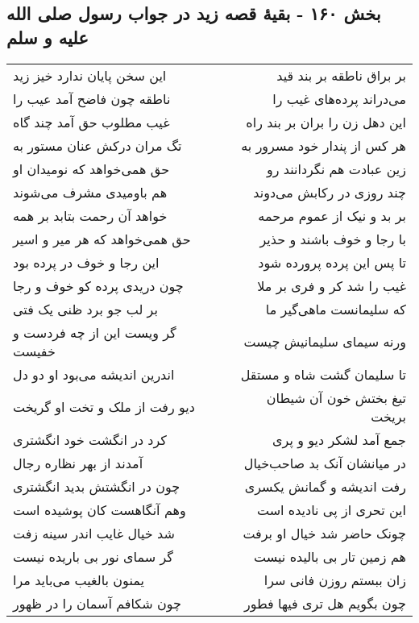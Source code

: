 \begin{center}
\section*{بخش ۱۶۰ - بقیهٔ قصه زید در جواب رسول صلی الله علیه و سلم}
\label{sec:sh160}
\begin{longtable}{l p{0.5cm} r}
این سخن پایان ندارد خیز زید
&&
بر براق ناطقه بر بند قید
\\
ناطقه چون فاضح آمد عیب را
&&
می‌دراند پرده‌های غیب را
\\
غیب مطلوب حق آمد چند گاه
&&
این دهل زن را بران بر بند راه
\\
تگ مران درکش عنان مستور به
&&
هر کس از پندار خود مسرور به
\\
حق همی‌خواهد که نومیدان او
&&
زین عبادت هم نگردانند رو
\\
هم باومیدی مشرف می‌شوند
&&
چند روزی در رکابش می‌دوند
\\
خواهد آن رحمت بتابد بر همه
&&
بر بد و نیک از عموم مرحمه
\\
حق همی‌خواهد که هر میر و اسیر
&&
با رجا و خوف باشند و حذیر
\\
این رجا و خوف در پرده بود
&&
تا پس این پرده پرورده شود
\\
چون دریدی پرده کو خوف و رجا
&&
غیب را شد کر و فری بر ملا
\\
بر لب جو برد ظنی یک فتی
&&
که سلیمانست ماهی‌گیر ما
\\
گر ویست این از چه فردست و خفیست
&&
ورنه سیمای سلیمانیش چیست
\\
اندرین اندیشه می‌بود او دو دل
&&
تا سلیمان گشت شاه و مستقل
\\
دیو رفت از ملک و تخت او گریخت
&&
تیغ بختش خون آن شیطان بریخت
\\
کرد در انگشت خود انگشتری
&&
جمع آمد لشکر دیو و پری
\\
آمدند از بهر نظاره رجال
&&
در میانشان آنک بد صاحب‌خیال
\\
چون در انگشتش بدید انگشتری
&&
رفت اندیشه و گمانش یکسری
\\
وهم آنگاهست کان پوشیده است
&&
این تحری از پی نادیده است
\\
شد خیال غایب اندر سینه زفت
&&
چونک حاضر شد خیال او برفت
\\
گر سمای نور بی باریده نیست
&&
هم زمین تار بی بالیده نیست
\\
یمنون بالغیب می‌باید مرا
&&
زان ببستم روزن فانی سرا
\\
چون شکافم آسمان را در ظهور
&&
چون بگویم هل تری فیها فطور
\\

\end{longtable}
\end{center}
